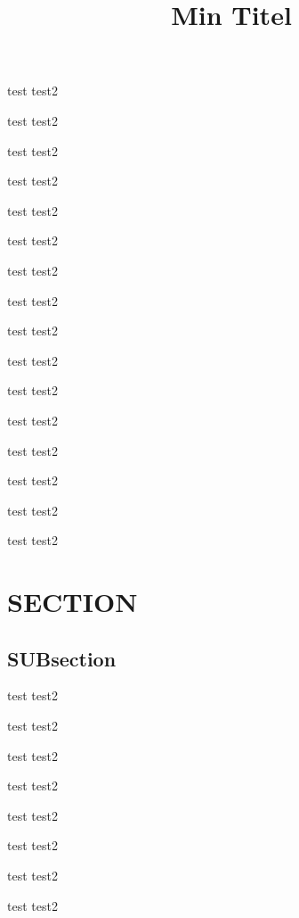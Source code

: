 \documentclass[aspectratio=169]{beamer}
\title{Min Titel}
\newcommand\TestFr{\begin{frame}
test
\pause%
test2

\end{frame}}
\begin{document}
\begin{frame}
	\titlepage
\end{frame}
\TestFr\TestFr\TestFr\TestFr\TestFr\TestFr\TestFr\TestFr
\TestFr\TestFr\TestFr\TestFr\TestFr\TestFr\TestFr\TestFr
\section{SECTION}%
\label{sec:section}

\subsection{SUBsection}%
\label{sub:subsection}


\TestFr\TestFr\TestFr\TestFr\TestFr\TestFr\TestFr\TestFr
\end{document}
